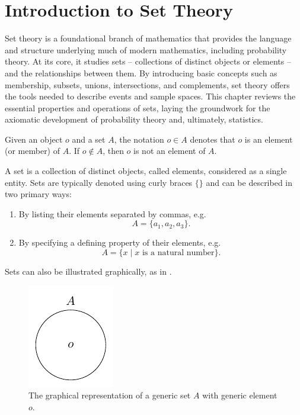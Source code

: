 \chapter{Introduction to Set Theory}
\label{chp:set_theory}
Set theory is a foundational branch of mathematics that provides the language and structure underlying much of modern mathematics, including probability theory. At its core, it studies sets -- collections of distinct objects or elements -- and the relationships between them. By introducing basic concepts such as membership, subsets, unions, intersections, and complements, set theory offers the tools needed to describe events and sample spaces. This chapter reviews the essential properties and operations of sets, laying the groundwork for the axiomatic development of probability theory and, ultimately, statistics.

\begin{definition}[Membership]
	\label{def:membership}
	Given an object $o$ and a set $A$, the notation $o \in A$ denotes that $o$ is an element (or member) of $A$. If $o \notin A$, then $o$ is not an element of $A$.
\end{definition}

\begin{definition}[Set]
	\label{def:set}
	A set is a collection of distinct objects, called elements, considered as a single entity. Sets are typically denoted using curly braces $\{\}$ and can be described in two primary ways:
	\begin{enumerate}
		\item By listing their elements separated by commas, e.g.
		\begin{equation}
			A = \{a_1, a_2, a_3\}.
		\end{equation}
		\item By specifying a defining property of their elements, e.g.
		\begin{equation}
			A = \{x \mid x \text{ is a natural number}\}.
		\end{equation}
	\end{enumerate}
	Sets can also be illustrated graphically, as in .
	\begin{figure}[H]
		\centering
		\includegraphics[]{figures/generic_set.pdf}
		\caption{The graphical representation of a generic set $A$ with generic element $o$.}
		\label{fig:generic_set}
	\end{figure}
\end{definition}


